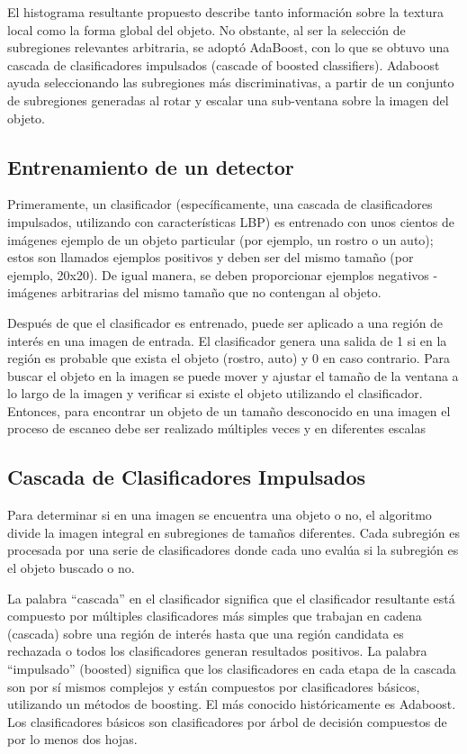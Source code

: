 El histograma resultante propuesto describe tanto información sobre la textura local como la forma global del objeto.
No obstante, al ser la selección de subregiones relevantes arbitraria, se adoptó AdaBoost, con lo que se obtuvo una cascada de clasificadores impulsados (cascade of boosted classifiers). Adaboost \cite{Viola2001-rh} ayuda seleccionando las subregiones más discriminativas, a partir de un conjunto de subregiones generadas al rotar y escalar una sub-ventana sobre la imagen del objeto. 

\subsection{Entrenamiento de un detector}
Primeramente, un clasificador (específicamente, una cascada de clasificadores impulsados, utilizando con características LBP) es entrenado con unos cientos de imágenes ejemplo de un objeto particular (por ejemplo, un rostro o un auto); estos son llamados ejemplos positivos y deben ser del mismo tamaño (por ejemplo, 20x20). De igual manera, se deben proporcionar ejemplos negativos - imágenes arbitrarias del mismo tamaño que no contengan al objeto.

Después de que el clasificador es entrenado, puede ser aplicado a una región de interés en una imagen de entrada. El clasificador genera una salida de 1 si en la región es probable que exista el objeto (rostro, auto) y 0 en caso contrario. Para buscar el objeto en la imagen se puede mover y ajustar el tamaño de la ventana a lo largo de la imagen y verificar si existe el objeto utilizando el clasificador. Entonces, para encontrar un objeto de un tamaño desconocido en una imagen el proceso de escaneo debe ser realizado múltiples veces y en diferentes escalas \cite{OpenCV2016-vq}


\subsection{Cascada de Clasificadores Impulsados}
Para determinar si en una imagen se encuentra una objeto o no, el algoritmo divide la imagen integral en subregiones de tamaños diferentes. Cada subregión es procesada por una serie de clasificadores donde cada uno evalúa si la subregión es el objeto buscado o no.

La palabra “cascada” en el clasificador significa que el clasificador resultante está compuesto por múltiples clasificadores más simples que trabajan en cadena (cascada) sobre una región de interés hasta que una región candidata es rechazada o todos los clasificadores generan resultados positivos. La palabra “impulsado” (boosted) significa que los clasificadores en cada etapa de la cascada son por sí mismos complejos y están compuestos por clasificadores básicos, utilizando un métodos de boosting. El más conocido históricamente es Adaboost. Los clasificadores básicos son clasificadores por árbol de decisión compuestos de por lo menos dos hojas.

